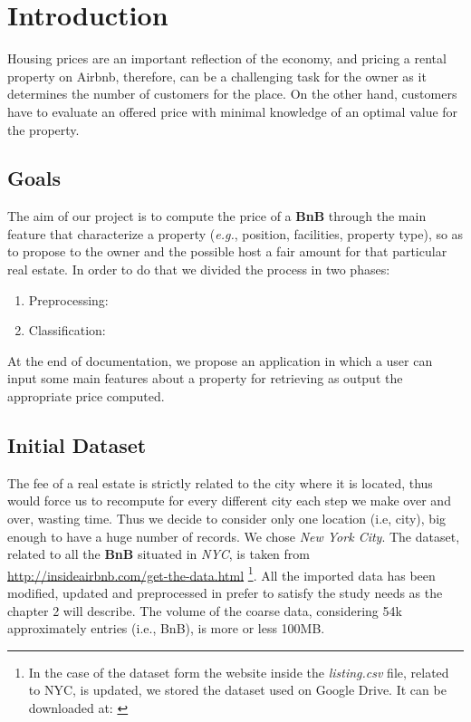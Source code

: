 \section{Introduction}
Housing prices are an important reflection of the economy, and pricing a rental property on Airbnb, therefore, can be a challenging task for the owner as it determines the number of customers for the place. On the other hand, customers have to evaluate an offered price with minimal knowledge of an optimal value for the property.

\subsection{Goals}
The aim of our project is to compute the price of a \textbf{BnB} through the main feature that characterize a property (\textit{e.g.}, position, facilities, property type), so as to propose to the owner and the possible host a fair amount for that particular real estate. In order to do that we divided the process in two phases:
\begin{enumerate}
	\item Preprocessing:
	\item Classification:
\end{enumerate}
At the end of documentation, we propose an application in which a user can input some main features about a property for retrieving as output the appropriate price computed.

\subsection{Initial Dataset}
The fee of a real estate is strictly related to the city where it is located, thus would force us to recompute for every different city each step we make over and over, wasting time. Thus we decide to consider only one location (i.e, city), big enough to have a huge number of records. We chose \textit{New York City}.
The dataset, related to all the \textbf{BnB} situated in \textit{NYC}, is taken from \url{http://insideairbnb.com/get-the-data.html} \footnote{In the case of the dataset form the website inside the \textit{listing.csv} file, related to NYC, is updated, we stored the dataset used on Google Drive. It can be downloaded at: \url{}}. All the imported data has been modified, updated and preprocessed in prefer to satisfy the study needs as the chapter 2 will describe.
The volume of the coarse data, considering 54k approximately entries (i.e., BnB), is more or less 100MB.

\medskip 
